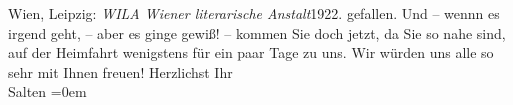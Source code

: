 \begin{ledgroupsized}[t]{13cm}
{{{                     Wien, Leipzig: \emph{WILA Wiener literarische Anstalt}1922.}}}\label{K_L03582-1h} gefallen. Und – wennn es
               irgend geht, – aber es ginge gewiß! – kommen Sie doch jetzt, da Sie so nahe sind, auf
               der Heimfahrt wenigstens für ein paar Tage zu uns. Wir würden uns alle so sehr mit
               Ihnen freuen!\pend
           \pstart
           Herzlichst Ihr {\\[\baselineskip]}\spacefill\mbox{Salten}\pend
           \leftskip=0em{}
         
         \endnumbering{}\end{ledgroupsized}\begin{anhang}\end{anhang}\newcommand{\dateiname}{L03582}\newcommand{\titel}{Felix Salten an Arthur Schnitzler, 17. 8. 1922}\newcommand{\editorInnen}{Martin Anton Müller und Laura Untner}
      